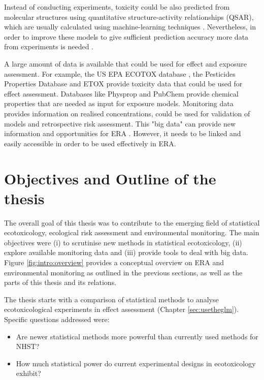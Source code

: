 Instead of conducting experiments, toxicity could be also predicted from molecular structures using quantitative structure-activity relationships (QSAR), which are usually calculated using machine-learning techniques \citep{murrell_chemically_2015, cortes-ciriano_bioalerts:_2016}. 
Nevertheless, in order to improve these models to give sufficient prediction accuracy more data from experiments is needed \citep{kuhne_read-across_2013}. 

A large amount of data is available that could be used for effect and exposure assessment. 
For example, the US EPA ECOTOX database \citep{u.s._epa_ecotoxicology_2016}, the Pesticides Properties Database \citep{lewis_international_2016} and ETOX \citep{umweltbundesamt_etox:_2016} provide toxicity data that could be used for effect assessment.
Databases like Physprop \citep{howard_physical_2016} and PubChem \citep{kim_pubchem_2016} provide chemical properties that are needed as input for exposure models.
Monitoring data provides information on realised concentrations, could be used for validation of models and retrospective risk assessment.
This "big data" can provide new information and opportunities for ERA \citep{dafforn_big_2015}. 
However, it needs to be linked and easily accessible in order to be used effectively in ERA.



\section{Objectives and Outline of the thesis}

The overall goal of this thesis was to contribute to the emerging field of statistical ecotoxicology, ecological risk assessment and environmental monitoring.
The main objectives were (i) to scrutinise new methods in statistical ecotoxicology,
(ii) explore available monitoring data and
(iii) provide tools to deal with big data.
Figure \ref{fig:intro:overview} provides a conceptual overview on ERA and environmental monitoring as outlined in the previous sections, as well as the parts of this thesis and its relations. 

\noindent The thesis starts with a comparison of statistical methods to analyse ecotoxicological experiments in effect assessment (Chapter \ref{sec:usetheglm}). 
Specific questions addressed were:

\begin{itemize}
	\item Are newer statistical methods more powerful than currently used methods for NHST?
	\item How much statistical power do current experimental designs in ecotoxicology exhibit?
\end{itemize}


